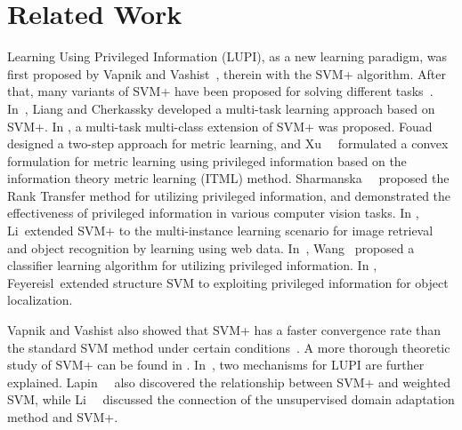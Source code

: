 \section{Related Work}
Learning Using Privileged Information (LUPI), as a new
learning paradigm, was first proposed by Vapnik and
Vashist~\citep{SVMplus_vapnik}, therein with the SVM+ algorithm. After
that, many variants of SVM+ have been proposed for solving different
tasks~\citep{MTLSVMPLUS,MetricPI,itmlplus,RankTransfer,Wang2015,Li2014ECCV}. In~\citep{MTLSVMPLUS},
Liang and Cherkassky developed a multi-task learning approach based on
SVM+. In \citep{MTMCSVMPLUS}, a multi-task multi-class extension of
SVM+ was proposed. Fouad~\etal~\citep{MetricPI} designed a two-step
approach for metric learning, and Xu~\etal~\citep{itmlplus} formulated
a convex formulation for metric learning using privileged information
based on the information theory metric learning (ITML)
method. Sharmanska~\etal~\citep{RankTransfer} proposed the Rank
Transfer method for utilizing privileged information, and demonstrated
the effectiveness of privileged information in various computer vision
tasks. In \citep{Li2014ECCV}, Li~\etal extended SVM+ to the
multi-instance learning scenario for image retrieval and object
recognition by learning using web data. In~\citep{Wang2015}, Wang~\etal
proposed a classifier learning algorithm for utilizing privileged
information. In \citep{Feyereisl2015}, Feyereisl~\etal extended
structure SVM to exploiting privileged information for object
localization.

Vapnik and Vashist also showed that SVM+ has a faster convergence rate
than the standard SVM method under certain
conditions~\citep{SVMplus_vapnik}. A more thorough theoretic study of
SVM+ can be found in \citep{LUPIThoery}. In~\citep{Vapnik2015}, two
mechanisms for LUPI are further
explained. Lapin~\etal~\citep{lapin2014learning} also discovered the
relationship between SVM+ and weighted SVM, while
Li~\etal~\citep{Li2014ECCV} discussed the connection of the
unsupervised domain adaptation method and SVM+.

